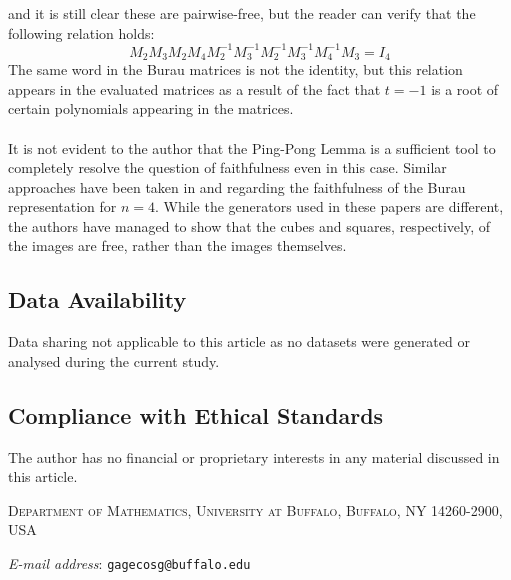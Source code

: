\documentclass[11pt]{article}
\makeatletter
\newcommand{\Addresses}{{%
		\bigskip
		\footnotesize
		
		\textsc{Department of Mathematics, University at Buffalo, Buffalo,
			NY 14260-2900, USA}\par\nopagebreak \textit{E-mail address}:
		\texttt{gagecosg@buffalo.edu}
	}}
\makeatother
\begin{document}
	and it is still clear these are pairwise-free, but the reader can verify that the following relation holds:
		$$M_2M_3M_2M_4M_2^{-1}M_3^{-1}M_2^{-1}M_3^{-1}M_4^{-1}M_3 = I_4$$
	The same word in the Burau matrices is not the identity, but this relation appears in the evaluated matrices as a result of the fact that $t=-1$ is a root of certain polynomials appearing in the matrices.
	\\
	\\
	It is not evident to the author that the Ping-Pong Lemma is a sufficient tool to completely resolve the question of faithfulness even in this case. Similar approaches have been taken in \cite{ber-big-tra} and \cite{abdul-jin} regarding the faithfulness of the Burau representation for $n=4$. While the generators used in these papers are different, the authors have managed to show that the cubes and squares, respectively, of the images are free, rather than the images themselves.
	
	
\subsection*{Data Availability}
Data sharing not applicable to this article as no datasets were generated or analysed during the current study.

\subsection*{Compliance with Ethical Standards}
The author has no financial or proprietary interests in any material discussed in this article.

{}

\Addresses
\end{document}
